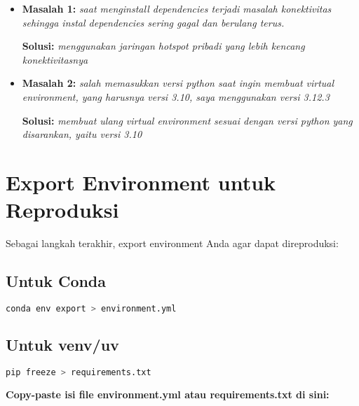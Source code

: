\documentclass[11pt,a4paper]{article}
\begin{document}
\begin{itemize}
    \item \textbf{Masalah 1:} \textit{saat menginstall dependencies terjadi masalah konektivitas sehingga instal dependencies sering gagal dan berulang terus.}
    
    \textbf{Solusi:} \textit{menggunakan jaringan hotspot pribadi yang lebih kencang konektivitasnya}
    
    \item \textbf{Masalah 2:} \textit{salah memasukkan versi python saat ingin membuat virtual environment, yang harusnya versi 3.10, saya menggunakan versi 3.12.3}
    
    \textbf{Solusi:} \textit{membuat ulang virtual environment sesuai dengan versi python yang disarankan, yaitu versi 3.10}
\end{itemize}

\section{Export Environment untuk Reproduksi}
Sebagai langkah terakhir, export environment Anda agar dapat direproduksi:

\subsection{Untuk Conda}
\begin{lstlisting}[language=bash, caption=Export conda environment]
conda env export > environment.yml
\end{lstlisting}

\subsection{Untuk venv/uv}
\begin{lstlisting}[language=bash, caption=Export pip requirements]
pip freeze > requirements.txt
\end{lstlisting}

\textbf{Copy-paste isi file environment.yml atau requirements.txt di sini:}
\end{document}
